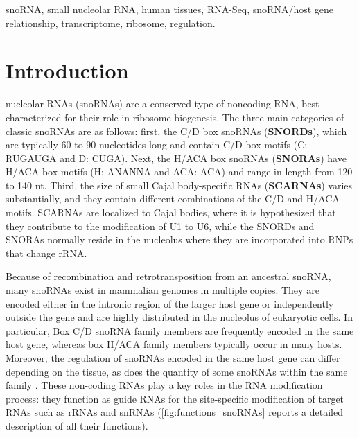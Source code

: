 \documentclass[journal]{IEEEtran}
\begin{document}
\begin{IEEEkeywords}
snoRNA, small nucleolar RNA, human tissues, RNA-Seq, snoRNA/host gene relationship,  transcriptome, ribosome, regulation.
\end{IEEEkeywords}


\IEEEpeerreviewmaketitle

\section{Introduction}
 nucleolar RNAs (snoRNAs) are a conserved type of noncoding RNA, best characterized for their role in ribosome biogenesis\cite{Zhang2019}. 
The three main categories of classic snoRNAs are as follows: first, the C/D box snoRNAs (\textbf{SNORDs}), which are typically 60 to 90 nucleotides long and contain C/D box motifs (C: RUGAUGA and D: CUGA). Next, the H/ACA box snoRNAs (\textbf{SNORAs}) have H/ACA box motifs (H: ANANNA and ACA: ACA) and range in length from 120 to 140 nt. Third, the size of small Cajal body-specific RNAs (\textbf{SCARNAs}) varies substantially, and they contain different combinations of the C/D and H/ACA motifs. SCARNAs are localized to Cajal bodies, where it is hypothesized that they contribute to the modification of U1 to U6, while the SNORDs and SNORAs normally reside in the nucleolus where they are incorporated into RNPs that change rRNA. \cite{vanderWerf2021} \newline

Because of recombination and retrotransposition from an ancestral snoRNA, many snoRNAs exist in mammalian genomes in multiple copies. They are encoded either in the intronic region of the larger host gene or independently outside the gene and are highly distributed in the nucleolus of eukaryotic cells. In particular, Box C/D snoRNA family members are frequently encoded in the same host gene, whereas box H/ACA family members typically occur in many hosts. Moreover, the regulation of snoRNAs encoded in the same host gene can differ depending on the tissue, as does the quantity of some snoRNAs within the same family \cite{Bergeron2021}. These non-coding RNAs play a key roles in the RNA modification process: they function as guide RNAs for the site-specific modification of target RNAs such as rRNAs and snRNAs \cite{Yoshihama2013} (\cref{fig:functions_snoRNAs} reports a detailed description of all their functions). \newline
\end{document}
